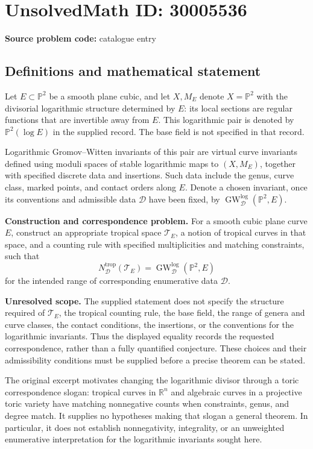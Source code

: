 \documentclass[11pt]{article}
\newcommand{\R}{\mathbb{R}}
\newcommand{\PP}{\mathbb{P}}
\begin{document}
\section*{UnsolvedMath ID: 30005536}
\textbf{Source problem code:} catalogue entry
\subsection{Definitions and mathematical statement}
Let \(E\subset\PP^2\) be a smooth plane cubic, and let \(X,M_E\) denote \(X=\PP^2\) with the divisorial logarithmic structure determined by \(E\): its local sections are regular functions that are invertible away from \(E\). This logarithmic pair is denoted by \(\PP^2(\log E)\) in the supplied record. The base field is not specified in that record.

Logarithmic Gromov--Witten invariants of this pair are virtual curve invariants defined using moduli spaces of stable logarithmic maps to \((X,M_E)\), together with specified discrete data and insertions. Such data include the genus, curve class, marked points, and contact orders along \(E\). Denote a chosen invariant, once its conventions and admissible data \(\mathcal D\) have been fixed, by \(\operatorname{GW}^{\log}_{\mathcal D}(\PP^2,E)\).

\textbf{Construction and correspondence problem.} For a smooth cubic plane curve \(E\), construct an appropriate tropical space \(\mathcal T_E\), a notion of tropical curves in that space, and a counting rule with specified multiplicities and matching constraints, such that
\[
N^{\mathrm{trop}}_{\mathcal D}(\mathcal T_E)
=
\operatorname{GW}^{\log}_{\mathcal D}(\PP^2,E)
\]
for the intended range of corresponding enumerative data \(\mathcal D\).

\textbf{Unresolved scope.} The supplied statement does not specify the structure required of \(\mathcal T_E\), the tropical counting rule, the base field, the range of genera and curve classes, the contact conditions, the insertions, or the conventions for the logarithmic invariants. Thus the displayed equality records the requested correspondence, rather than a fully quantified conjecture. These choices and their admissibility conditions must be supplied before a precise theorem can be stated.

The original excerpt motivates changing the logarithmic divisor through a toric correspondence slogan: tropical curves in \(\R^n\) and algebraic curves in a projective toric variety have matching nonnegative counts when constraints, genus, and degree match. It supplies no hypotheses making that slogan a general theorem. In particular, it does not establish nonnegativity, integrality, or an unweighted enumerative interpretation for the logarithmic invariants sought here.
\end{document}
